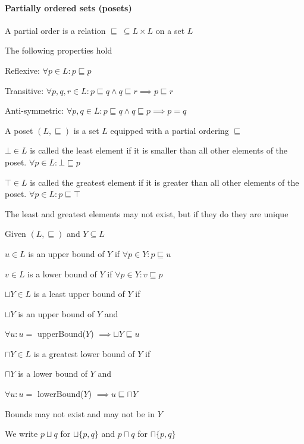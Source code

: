 \paragraph{Partially ordered sets (posets)}
\enumstart
	\item A partial order is a relation $\sqsubseteq \ \subseteq L \times L$ on a set $L$
	\item The following properties hold
	\enumstart
		\item Reflexive: $\forall p \in L: p \sqsubseteq p$
		\item Transitive: $\forall p,q,r \in L: p \sqsubseteq q \land q \sqsubseteq r \implies p \sqsubseteq r$
		\item Anti-symmetric: $\forall p,q \in L: p \sqsubseteq q \land q \sqsubseteq p \implies p = q$
	\enumend
	\item A poset $(L, \sqsubseteq)$ is a set $L$ equipped with a partial ordering $\sqsubseteq$
	\item $\bot \in L$ is called the least element if it is smaller than all other elements of the poset. $\forall p \in L: \bot \sqsubseteq p$
	\item $\top \in L$ is called the greatest element if it is greater than all other elements of the poset. $\forall p \in L: p \sqsubseteq \top$
	\item The least and greatest elements may not exist, but if they do they are unique
	\item Given $(L, \sqsubseteq)$ and $Y \subseteq L$
	\enumstart
		\item $u \in L$ is an upper bound of $Y$ if $\forall p \in Y: p \sqsubseteq u$
		\item $v \in L$ is a lower bound of $Y$ if $\forall p \in Y: v \sqsubseteq p$
		\item $\sqcup Y \in L$ is a least upper bound of $Y$ if
		\enumstart
			\item $\sqcup Y$ is an upper bound of $Y$ and
			\item $\forall u: u =$ upperBound($Y$) $\implies \sqcup Y \sqsubseteq u$
		\enumend
		\item $\sqcap Y \in L$ is a greatest lower bound of $Y$ if
		\enumstart
			\item $\sqcap Y$ is a lower bound of $Y$ and
			\item $\forall u: u =$ lowerBound($Y$) $\implies u \sqsubseteq \sqcap Y$
		\enumend
		\item Bounds may not exist and may not be in $Y$
		\item We write $p \sqcup q$ for $\sqcup\{p, q\}$ and $p \sqcap q$ for $\sqcap\{p, q\}$
	\enumend
\enumend

